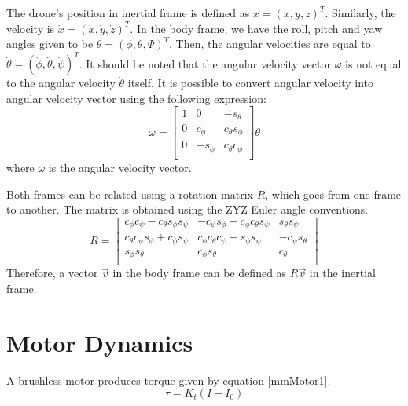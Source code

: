 The drone's position in inertial frame is defined as $x = (x,y,z)^T$. Similarly, the velocity is $\dot{x} = (\dot{x},\dot{y},\dot{z})^T$. In the body frame, we have the roll, pitch and yaw angles given to be $\theta = (\phi,\theta,\Psi)^T$. Then, the angular velocities are equal to $\dot{\theta} = (\dot{\phi},\dot{\theta},\dot{\psi})^T$.
It should be noted that the angular velocity vector $\omega$ is not equal to the angular velocity $\dot{\theta}$ itself. It is possible to convert angular velocity into angular velocity vector using the following expression:
\begin{equation}
\label{mmKinematics1}
\omega = \begin{bmatrix}
       	1		& 0 		& -s_\theta			\\
       	0 		& c_\phi 	& c_\theta s_\phi 	\\
      	0       & -s_\phi 	& c_\theta c_\phi 	\\
\end{bmatrix} \dot{\theta}
\end{equation}
where $\omega$ is the angular velocity vector.

Both frames can be related using a rotation matrix $R$, which goes from one frame to another. The matrix is obtained using the ZYZ Euler angle conventions.
\begin{equation}
\label{mmKinematics2}
R = \begin{bmatrix}
       	c_\phi c_\psi - c_\theta s_\phi s_\psi		& -c_\psi s_\phi - c_\phi c_\theta s_\psi 	& s_\theta s_\psi			\\
       	c_\theta c_\psi s_\phi + c_\phi s_\psi 		& c_\phi c_\theta c_\psi - s_\phi s_\psi 	& -c_\psi s_\theta 			\\
      	s_\phi s_\theta       						& c_\phi s_\theta 								& c_\theta 					\\
\end{bmatrix}
\end{equation}
Therefore, a vector $\overrightarrow{v}$ in the body frame can be defined as $R\overrightarrow{v}$ in the inertial frame.

\section{Motor Dynamics}
A brushless motor produces torque given by equation \ref{mmMotor1}.
\begin{equation}
\label{mmMotor1}
	\tau = K_t(I-I_0)
\end{equation}

